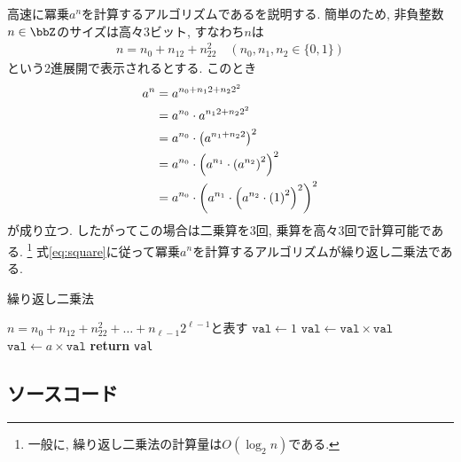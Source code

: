 \documentclass[10pt]{ltjsarticle}
\begin{document}
高速に冪乗$a^n$を計算するアルゴリズムであるを説明する.
簡単のため, 非負整数$n\in\bbZ$のサイズは高々3ビット, すなわち$n$は
\begin{align}
	n=n_0+n_12+n_22^2 \quad (n_0, n_1, n_2\in \{0, 1\})
\end{align}
という2進展開で表示されるとする. このとき
\begin{align}
	a^n
	&=a^{n_0+n_12+n_22^2}\\
	&=a^{n_0}\cdot a^{n_12+n_22^2}\\
	&=a^{n_0}\cdot \skakko*{a^{n_1+n_22}}^2\\
	&=a^{n_0}\cdot \skakko*{a^{n_1}\cdot \skakko*{a^{n_2}}^2}^2\\
	&=a^{n_0}\cdot \skakko*{a^{n_1}\cdot \skakko*{a^{n_2}\cdot \skakko*{1}^2}^2}^2\\ \label{eq:square}
\end{align}
が成り立つ. したがってこの場合は二乗算を3回, 乗算を高々3回で計算可能である.
\footnote{一般に, 繰り返し二乗法の計算量は$O(\log_2 n)$である.}
式\eqref{eq:square}に従って冪乗$a^n$を計算するアルゴリズムが繰り返し二乗法である.

\begin{algorithm}

	\caption{繰り返し二乗法}
	
	\begin{algorithmic}[1]

			\State $n=n_0+n_12+n_22^2+\dots+n_{\ell-1}2^{\ell-1}$と表す
			\State $\texttt{val}\gets 1$
				\State $\texttt{val}\gets \texttt{val}\times\texttt{val}$
					\State $\texttt{val}\gets a\times\texttt{val}$
				\EndIf
			\EndFor
			\State \textbf{return} \texttt{val}
		\EndFunction

	\end{algorithmic}

\end{algorithm}

\subsection{ソースコード}

\lipsum[1-2]

\newpage
\printbibliography[title=参考文献]
\end{document}

